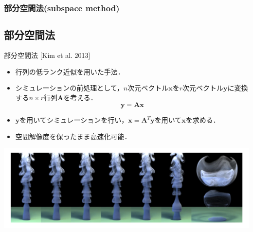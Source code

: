 \documentclass[aspectratio=169,dvipdfmx,hyperref={bookmarks=true}]{beamer}
\begin{document}

   \begin{frame}
  \frametitle{部分空間法(subspace method)}
 \subsection{部分空間法}
\begin{block}{部分空間法\cite{subspace} [Kim et al. 2013]}
\begin{itemize}
\item 行列の低ランク近似を用いた手法．

 \item シミュレーションの前処理として，$n$次元ベクトル$\bm{x}$を$r$次元ベクトル$\bm{y}$に変換する$n \times r$行列$\mathbf{A}$を考える．
 \[
 \bm{y} = \mathbf{A}\bm{x}
 \]
 
	\item $\bm{y}$を用いてシミュレーションを行い，$\bm{x} = \mathbf{A}^{T}\bm{y}$を用いて$\bm{x}$を求める．
	\item 空間解像度を保ったまま高速化可能．
\end{itemize}
\end{block}
\centering
\includegraphics[width=0.7\linewidth]{images/subspace.png}
 \end{frame}
\end{document}
